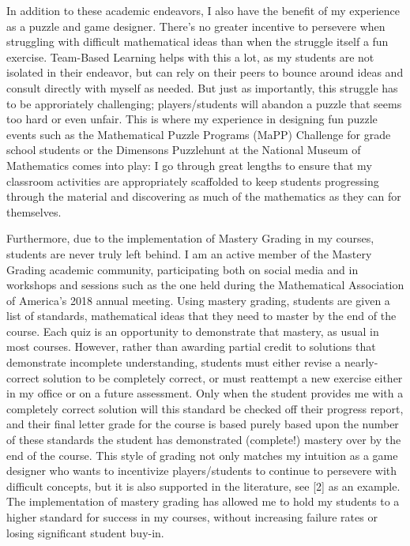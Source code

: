 \documentclass[11pt]{amsart}
\theoremstyle{plain}
\newcommand{\<}{\langle}
\renewcommand{\>}{\rangle}
\begin{document}
In addition to these academic endeavors, I also have the benefit of my experience as a puzzle and game designer. There's no greater incentive to persevere when struggling with difficult mathematical ideas than when the struggle itself a fun exercise. Team-Based Learning helps with this a lot, as my students are not isolated in their endeavor, but can rely on their peers to bounce around ideas and consult directly with myself as needed. But just as importantly, this struggle has to be approriately challenging; players/students will abandon a puzzle that seems too hard or even unfair. This is where my experience in designing fun puzzle events such as the Mathematical Puzzle Programs (MaPP) Challenge for grade school students or the Dimensons Puzzlehunt at the National Museum of Mathematics comes into play: I go through great lengths to ensure that my classroom activities are appropriately scaffolded to keep students progressing through the material and discovering as much of the mathematics as they can for themselves.  

Furthermore, due to the implementation of Mastery Grading in my courses, students are never truly left behind.   I am an active member of the Mastery Grading academic community, participating both on social media and in workshops and sessions such as the one held during the Mathematical Association of America's 2018 annual meeting. Using mastery grading, students are given a list of standards, mathematical ideas that they need to master by the end of the course. Each quiz is an opportunity to demonstrate that mastery, as usual in most courses. However, rather than awarding partial credit to solutions that demonstrate incomplete understanding, students must either revise  a nearly-correct solution to be completely correct, or must reattempt a new exercise either in my office or on a future assessment. Only when the student provides me with a completely correct solution will this standard be checked off their progress report, and their final letter grade for the course is based purely based upon the number of these standards the student has demonstrated (complete!) mastery over by the end of the course.  This style of grading not only matches my intuition as a game designer who wants to incentivize players/students to continue to persevere with difficult concepts, but it is also supported in the literature, see [2] as an example. The implementation of mastery grading has allowed me to hold my students to a higher standard for success in my courses, without increasing failure rates or losing significant student buy-in.   
\end{document}
